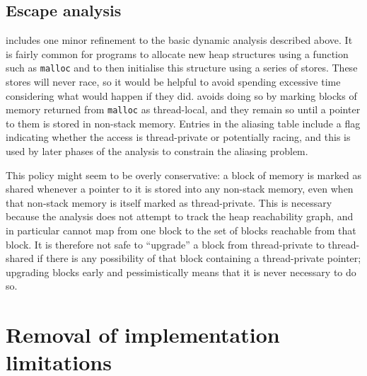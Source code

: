 \subsection{Escape analysis}
{\Implementation} includes one minor refinement to the basic dynamic
analysis described above.  It is fairly common for programs to
allocate new heap structures using a function such as \texttt{malloc}
and to then initialise this structure using a series of stores.  These
stores will never race, so it would be helpful to avoid spending
excessive time considering what would happen if they did.
{\Technique} avoids doing so by marking blocks of memory returned from
\texttt{malloc} as thread-local, and they remain so until a pointer to
them is stored in non-stack memory.  Entries in the aliasing table
include a flag indicating whether the access is thread-private or
potentially racing, and this is used by later phases of the analysis
to constrain the aliasing problem.

This policy might seem to be overly conservative: a block of memory is
marked as shared whenever a pointer to it is stored into any non-stack
memory, even when that non-stack memory is itself marked as
thread-private.  This is necessary because the analysis does not
attempt to track the heap reachability graph, and in particular cannot
map from one block to the set of blocks reachable from that block.  It
is therefore not safe to ``upgrade'' a block from thread-private to
thread-shared if there is any possibility of that block containing a
thread-private pointer; upgrading blocks early and pessimistically
means that it is never necessary to do so.

\section{Removal of implementation limitations}

